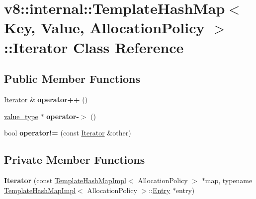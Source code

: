 \hypertarget{classv8_1_1internal_1_1_template_hash_map_1_1_iterator}{}\section{v8\+:\+:internal\+:\+:Template\+Hash\+Map$<$ Key, Value, Allocation\+Policy $>$\+:\+:Iterator Class Reference}
\label{classv8_1_1internal_1_1_template_hash_map_1_1_iterator}
\subsection*{Public Member Functions}
\begin{DoxyCompactItemize}
\item 
\hyperlink{classv8_1_1internal_1_1_template_hash_map_1_1_iterator}{Iterator} \& {\bfseries operator++} ()\hypertarget{classv8_1_1internal_1_1_template_hash_map_1_1_iterator_a2a2164cb6ae02f3431a2e55e28138850}{}\label{classv8_1_1internal_1_1_template_hash_map_1_1_iterator_a2a2164cb6ae02f3431a2e55e28138850}

\item 
\hyperlink{structv8_1_1internal_1_1_template_hash_map_1_1value__type}{value\+\_\+type} $\ast$ {\bfseries operator-\/$>$} ()\hypertarget{classv8_1_1internal_1_1_template_hash_map_1_1_iterator_a98831c55b13b54ec82660242e01773d4}{}\label{classv8_1_1internal_1_1_template_hash_map_1_1_iterator_a98831c55b13b54ec82660242e01773d4}

\item 
bool {\bfseries operator!=} (const \hyperlink{classv8_1_1internal_1_1_template_hash_map_1_1_iterator}{Iterator} \&other)\hypertarget{classv8_1_1internal_1_1_template_hash_map_1_1_iterator_ade3b56449347905218dcfbc04324dc37}{}\label{classv8_1_1internal_1_1_template_hash_map_1_1_iterator_ade3b56449347905218dcfbc04324dc37}

\end{DoxyCompactItemize}
\subsection*{Private Member Functions}
\begin{DoxyCompactItemize}
\item 
{\bfseries Iterator} (const \hyperlink{classv8_1_1internal_1_1_template_hash_map_impl}{Template\+Hash\+Map\+Impl}$<$ Allocation\+Policy $>$ $\ast$map, typename \hyperlink{classv8_1_1internal_1_1_template_hash_map_impl}{Template\+Hash\+Map\+Impl}$<$ Allocation\+Policy $>$\+::\hyperlink{structv8_1_1internal_1_1_template_hash_map_impl_1_1_entry}{Entry} $\ast$entry)\hypertarget{classv8_1_1internal_1_1_template_hash_map_1_1_iterator_a5d6e5e5c5fa62b9639ec6b1484c38dba}{}\label{classv8_1_1internal_1_1_template_hash_map_1_1_iterator_a5d6e5e5c5fa62b9639ec6b1484c38dba}

\end{DoxyCompactItemize}
